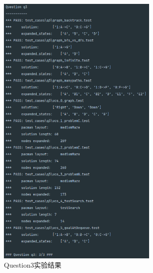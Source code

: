 \begin{figure}[!htbp]
    \centering
    \includegraphics[width=0.7\textwidth]{pic/q3.png}
    \caption{Question3实验结果}\label{q3}
\end{figure}
